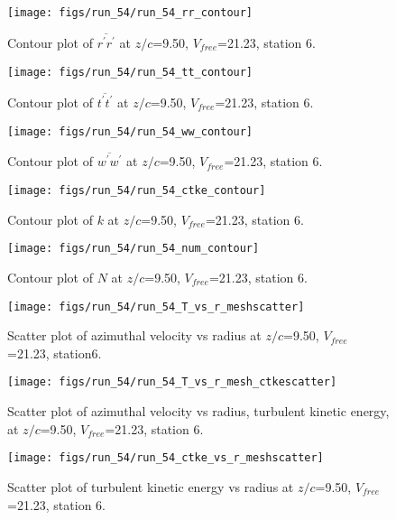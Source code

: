 \begin{figure}[H]
\centering
\texttt{[image: figs/run\_54/run\_54\_rr\_contour]}
\caption{Contour plot of $\overline{r^\prime r^\prime}$ at $z/c$=9.50, $V_{free}$=21.23, station 6.}
\label{fig:run_54_rr_contour}
\end{figure}


\begin{figure}[H]
\centering
\texttt{[image: figs/run\_54/run\_54\_tt\_contour]}
\caption{Contour plot of $\overline{t^\prime t^\prime}$ at $z/c$=9.50, $V_{free}$=21.23, station 6.}
\label{fig:run_54_tt_contour}
\end{figure}


\begin{figure}[H]
\centering
\texttt{[image: figs/run\_54/run\_54\_ww\_contour]}
\caption{Contour plot of $\overline{w^\prime w^\prime}$ at $z/c$=9.50, $V_{free}$=21.23, station 6.}
\label{fig:run_54_ww_contour}
\end{figure}


\begin{figure}[H]
\centering
\texttt{[image: figs/run\_54/run\_54\_ctke\_contour]}
\caption{Contour plot of $k$ at $z/c$=9.50, $V_{free}$=21.23, station 6.}
\label{fig:run_54_ctke_contour}
\end{figure}


\begin{figure}[H]
\centering
\texttt{[image: figs/run\_54/run\_54\_num\_contour]}
\caption{Contour plot of $N$ at $z/c$=9.50, $V_{free}$=21.23, station 6.}
\label{fig:run_54_num_contour}
\end{figure}


\begin{figure}[H]
\centering
\texttt{[image: figs/run\_54/run\_54\_T\_vs\_r\_meshscatter]}
\caption{Scatter plot of azimuthal velocity vs radius at $z/c$=9.50, $V_{free}$=21.23, station6.}
\label{fig:run_54_T_vs_r_meshscatter}
\end{figure}


\begin{figure}[H]
\centering
\texttt{[image: figs/run\_54/run\_54\_T\_vs\_r\_mesh\_ctkescatter]}
\caption{Scatter plot of azimuthal velocity vs radius, turbulent kinetic energy, at $z/c$=9.50, $V_{free}$=21.23, station 6.}
\label{fig:run_54_T_vs_r_mesh_ctkescatter}
\end{figure}


\begin{figure}[H]
\centering
\texttt{[image: figs/run\_54/run\_54\_ctke\_vs\_r\_meshscatter]}
\caption{Scatter plot of turbulent kinetic energy vs radius at $z/c$=9.50, $V_{free}$=21.23, station 6.}
\label{fig:run_54_ctke_vs_r_meshscatter}
\end{figure}



